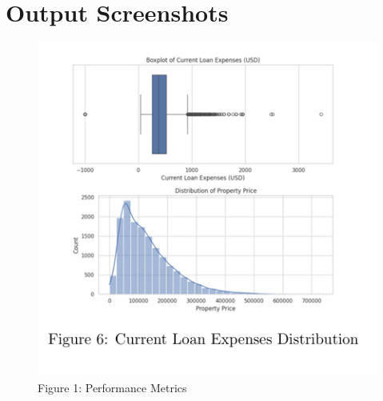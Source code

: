 \documentclass[12pt]{article}
\begin{document}
\section*{Output Screenshots}
\begin{figure}[H]
      \centering
      \includegraphics[width=0.5\linewidth]{image.png}
      \caption{ Figure 1: Performance Metrics}
      \label{fig:enter-label}
  \end{figure}
  
\end{document}

